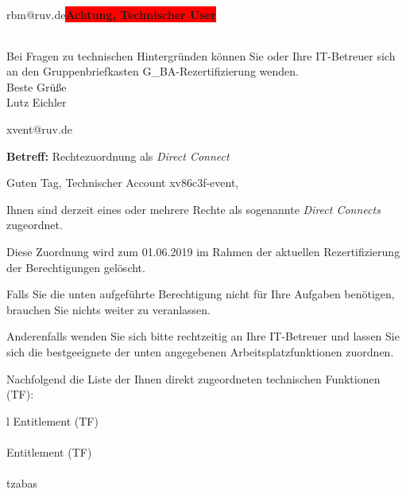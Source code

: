 \documentclass[a4paper,landscape,12pt]{letter}
\begin{document}
\begin{letter}{rbm@ruv.de\space\space\space\space\space\space\space\space\space\bfseries\colorbox{red}{Achtung, Technischer User}\hfill \break}
\begin{tiny}
\begin{longtable}{|p{35mm}|p{15mm}|p{25mm}|p{10mm}|p{40mm}|p{50mm}|p{50mm}|}
\hline
		\end{longtable}
		\end{tiny}
	
\begin{minipage}{\textwidth}
			Bei Fragen zu technischen Hintergründen können Sie 
			oder Ihre IT-Betreuer sich an den Gruppenbriefkasten 
			G\_BA-Rezertifizierung
			wenden.\\
			\linebreak
			Beste Grüße\\
			Lutz Eichler
	\end{minipage}
	\end{letter}
	
\begin{letter}{xvent@ruv.de\hfill \break}
\begin{normalsize}
	\opening{\textbf{Betreff:} Rechtezuordnung als \emph{Direct Connect}}
	\begin{normalsize} \hfill
	\end{normalsize}

	\begin{normalsize}
		Guten Tag, 
	Technischer Account xv86c3f-event, \hfill \break
	\end{normalsize}
	\end{normalsize}
	
\begin{normalsize}
	Ihnen sind derzeit eines oder mehrere Rechte als sogenannte \emph{Direct Connects} zugeordnet.
	
	Diese Zuordnung wird zum 01.06.2019 im Rahmen der aktuellen Rezertifizierung der Berechtigungen gelöscht.
	
	Falls Sie die unten aufgeführte Berechtigung nicht für Ihre Aufgaben benötigen, 
	brauchen Sie nichts weiter zu veranlassen.
	
	Anderenfalls wenden Sie sich bitte rechtzeitig an Ihre IT-Betreuer 
	und lassen Sie sich die bestgeeignete der unten angegebenen Arbeitsplatzfunktionen zuordnen.
	\end{normalsize}
	
\begin{normalsize}
	Nachfolgend die Liste der Ihnen direkt zugeordneten technischen Funktionen (TF):

	\begin{longtable}{l}
		Entitlement (TF) \\ \hline
		\endfirsthead
		\\\hline
		Entitlement (TF) \\ \hline
		\endhead %
		\multicolumn{1}{r@{}}{Fortsetzung \ldots}\\
		\endfoot
		\hline
		\endlastfoot
	tzabas\\
	\end{longtable}
	\end{normalsize}
	

\end{letter}
\end{document}
